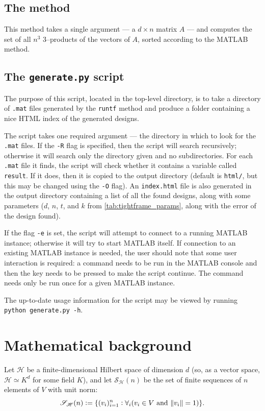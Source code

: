 \documentclass{article}
\newcommand{\scrS}{\mathscr{S}}
\newcommand{\scrH}{\mathscr{H}}
\theoremstyle{definition}
\begin{document}
  \subsection{The  method}
  This method takes a single argument --- a $ d \times n $ matrix $ A $ --- and computes the set of all $ n^3 $ 3--products of the vectors of $ A $,
  sorted according to the MATLAB  method.

  \subsection{The \texttt{generate.py} script}
  The purpose of this script, located in the top-level directory, is to take a directory of \texttt{.mat} files generated
  by the \texttt{runtf} method and produce a folder containing a nice HTML index of the generated designs.

  The script takes one required argument --- the directory in which to look for the \texttt{.mat} files. If the \texttt{-R}
  flag is specified, then the script will search recursively; otherwise it will search only the directory given and no subdirectories.
  For each \texttt{.mat} file it finds, the script will check whether it contains a variable called \texttt{result}. If it does,
  then it is copied to the output directory (default is \texttt{html/}, but this may be changed using the \texttt{-O} flag). An
  \texttt{index.html} file is also generated in the output directory containing a list of all the found designs, along with some
  parameters ($d$, $n$, $t$, and $k $ from \cref{tab:tightframe_params}, along with the error of the design found).

  If the flag \texttt{-e} is set, the script will attempt to connect to a running MATLAB instance; otherwise it will try to start
  MATLAB itself. If connection to an existing MATLAB instance is needed, the user should note that some user interaction is required:
  a command needs to be run in the MATLAB console and then the \Enter key needs to be pressed to make the script continue. The command
  needs only be run once for a given MATLAB instance.

  The up-to-date usage information for the script may be viewed by running \texttt{python generate.py -h}.

  \section{Mathematical background}
  Let $ \scrH $ be a finite-dimensional Hilbert space of dimension $ d $ (so, as a vector space,
  $ \scrH \simeq K^d $ for some field $ K $), and let $ \scrS_\scrH(n) $ be the set of finite
  sequences of $ n $ elements of $ V $ with unit norm:
  \begin{displaymath}
    \scrS_\scrH(n) := \{ (v_i)_{i = 1}^n : \forall_i (v_i \in V \text{ and } \norm{v_i} = 1) \}.
  \end{displaymath}
\end{document}
